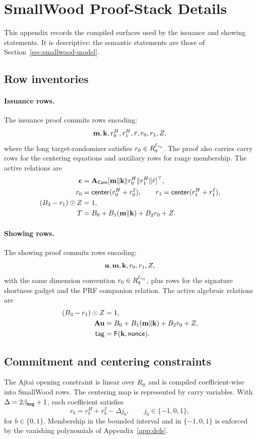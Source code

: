 \section{SmallWood Proof-Stack Details}
\label{app:smallwood}

This appendix records the compiled surfaces used by the issuance and showing statements.  It is descriptive: the
semantic statements are those of Section~\ref{sec:smallwood-model}.

\subsection{Row inventories}
\paragraph{Issuance rows.}
The issuance proof commits rows encoding:
\[
  \mathbf{m},
  \mathbf{k},
  r_0^H,
  r_1^H,
  \bar r,
  r_0,
  r_1,
  Z,
\]
where the long target-randomizer satisfies $r_0\in R_q^{\ell_{r_0}}$.  The proof also carries carry rows for the
centering equations and auxiliary rows for range membership.  The active relations are
\begin{align*}
  \mathbf{c}&=\mathbf{A}_{\mathsf{Com}}[\mathbf{m}\Vert\mathbf{k}\Vert r_0^H\Vert r_1^H\Vert\bar r]^\top,\\
  r_0&=\mathsf{center}(r_0^H+r_0^I),\qquad r_1=\mathsf{center}(r_1^H+r_1^I),\\
  (B_3-r_1)\odot Z&=1,\\
  T&=B_0+B_1(\mathbf{m}\Vert\mathbf{k})+B_2r_0+Z.
\end{align*}

\paragraph{Showing rows.}
The showing proof commits rows encoding:
\[
  \mathbf{u},
  \mathbf{m},
  \mathbf{k},
  r_0,
  r_1,
  Z,
\]
with the same dimension convention $r_0\in R_q^{\ell_{r_0}}$, plus rows for the signature shortness gadget and the
PRF companion relation.  The active algebraic relations are
\begin{align*}
  (B_3-r_1)\odot Z&=1,\\
  \mathbf{A}\mathbf{u}&=B_0+B_1(\mathbf{m}\Vert\mathbf{k})+B_2r_0+Z,\\
  \mathsf{tag}&=\mathsf{F}(\mathbf{k},\mathsf{nonce}).
\end{align*}

\subsection{Commitment and centering constraints}
The Ajtai opening constraint is linear over $R_q$ and is compiled coefficient-wise into SmallWood rows.  The centering
map is represented by carry variables.  With $\Delta=2\beta_{\mathtt{msg}}+1$, each coefficient satisfies
\[
  r_b = r_b^H+r_b^I-\Delta j_b,
  \qquad j_b\in\{-1,0,1\},
\]
for $b\in\{0,1\}$.  Membership in the bounded interval and in $\{-1,0,1\}$ is enforced by the vanishing
polynomials of Appendix~\ref{app:defs}.

